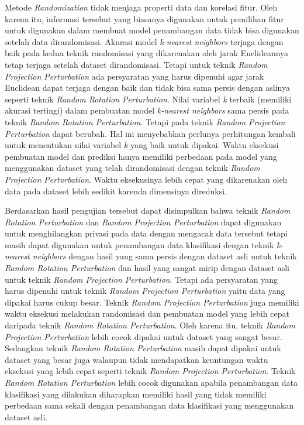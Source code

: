 Metode \textit{Randomization} tidak menjaga properti data dan korelasi fitur. Oleh karena itu, informasi tersebut yang biasanya digunakan untuk pemilihan fitur untuk digunakan dalam membuat model penambangan data tidak bisa digunakan setelah data dirandomisasi. Akurasi model \textit{k-nearest neighbors} terjaga dengan baik pada kedua teknik randomisasi yang dikarenakan oleh jarak Euclideannya tetap terjaga setelah dataset dirandomisasi. Tetapi untuk teknik \textit{Random Projection Perturbation} ada persyaratan yang harus dipenuhi agar jarak Euclidean dapat terjaga dengan baik dan tidak bisa sama persis dengan aslinya seperti teknik \textit{Random Rotation Perturbation}. Nilai variabel \textit{k} terbaik (memiliki akurasi tertingi) dalam pembuatan model \textit{k-nearest neighbors} sama persis pada teknik \textit{Random Rotation Perturbation}. Tetapi pada teknik \textit{Random Projection Perturbation} dapat berubah. Hal ini menyebabkan perlunya perhitungan kembali untuk menentukan nilai variabel \textit{k} yang baik untuk dipakai. Waktu eksekusi pembuatan model dan prediksi hanya memiliki perbedaan pada model yang menggunakan dataset yang telah dirandomisasi dengan teknik \textit{Random Projection Perturbation}. Waktu eksekusinya lebih cepat yang dikarenakan oleh data pada dataset lebih sedikit karenda dimensinya direduksi.

Berdasarkan hasil pengujian tersebut dapat disimpulkan bahwa teknik \textit{Random Rotation Perturbation} dan \textit{Random Projection Perturbation} dapat digunakan untuk menghilangkan privasi pada data dengan mengacak data tersebut tetapi masih dapat digunakan untuk penambangan data klasifikasi dengan teknik \textit{k-nearest neighbors} dengan hasil yang sama persis dengan dataset asli untuk teknik \textit{Random Rotation Perturbation} dan hasil yang sangat mirip dengan dataset asli untuk teknik \textit{Random Projection Perturbation}. Tetapi ada persyaratan yang harus dipenuhi untuk teknik \textit{Random Projection Perturbation} yaitu data yang dipakai harus cukup besar. Teknik \textit{Random Projection Perturbation} juga memiliki waktu eksekusi melakukan randomisasi dan pembuatan model yang lebih cepat daripada teknik \textit{Random Rotation Perturbation}. Oleh karena itu, teknik \textit{Random Projection Perturbation} lebih cocok dipakai untuk dataset yang sangat besar. Sedangkan teknik \textit{Random Rotation Perturbation} masih dapat dipakai untuk dataset yang besar juga walaupun tidak mendapatkan keuntungan waktu eksekusi yang lebih cepat seperti teknik \textit{Random Projection Perturbation}. Teknik \textit{Random Rotation Perturbation} lebih cocok digunakan apabila penambangan data klasifikasi yang dilakukan diharapkan memiliki hasil yang tidak memiliki perbedaan sama sekali dengan penambangan data klasifikasi yang menggunakan dataset asli. 

